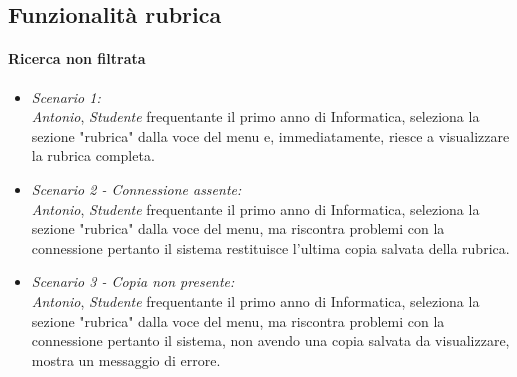 \subsection{Funzionalità rubrica}

\paragraph{Ricerca non filtrata \\}
\begin{itemize}
	\item \textit{Scenario 1:\\}
	\textit{Antonio}, \textit{Studente} frequentante il primo anno di Informatica, seleziona la sezione "rubrica" dalla voce del menu e, immediatamente, riesce a visualizzare la rubrica completa.\\
	
	\item \textit{Scenario 2 - Connessione assente:\\}
	\textit{Antonio}, \textit{Studente} frequentante il primo anno di Informatica, seleziona la sezione "rubrica" dalla voce del menu, ma riscontra problemi con la connessione pertanto il sistema restituisce l'ultima copia salvata della rubrica.\\
	
	\item \textit{Scenario 3 - Copia non presente:\\}
	\textit{Antonio}, \textit{Studente} frequentante il primo anno di Informatica, seleziona la sezione "rubrica" dalla voce del menu, ma riscontra problemi con la connessione pertanto il sistema, non avendo una copia salvata da visualizzare, mostra un messaggio di errore.\\	
\end{itemize}

